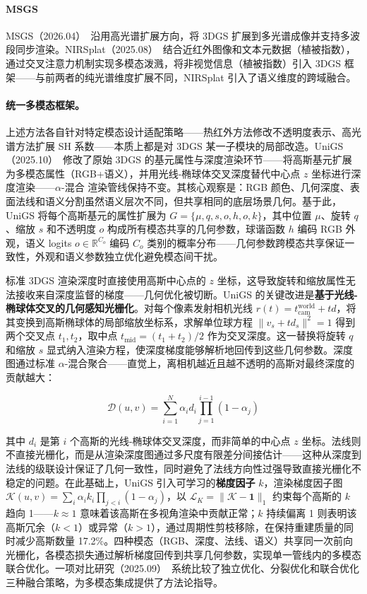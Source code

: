 \paragraph{MSGS}
MSGS（2026.04）~\cite{2604_13340}沿用高光谱扩展方向，将 3DGS 扩展到多光谱成像并支持多波段同步渲染。NIRSplat（2025.08）~\cite{2508_14443}结合近红外图像和文本元数据（植被指数），通过交叉注意力机制实现多模态泼溅，将非视觉信息（植被指数）引入 3DGS 框架——与前两者的纯光谱维度扩展不同，NIRSplat 引入了语义维度的跨域融合。

\paragraph{统一多模态框架。} 上述方法各自针对特定模态设计适配策略——热红外方法修改不透明度表示、高光谱方法扩展 SH 系数——本质上都是对 3DGS 某一子模块的局部改造。UniGS（2025.10）~\cite{2510_12174}修改了原始 3DGS 的基元属性与深度渲染环节——将高斯基元扩展为多模态属性（RGB+语义），并用光线-椭球体交叉深度替代中心点 $z$ 坐标进行深度渲染——$\alpha$-混合 渲染管线保持不变。其核心观察是：RGB 颜色、几何深度、表面法线和语义分割虽然语义层次不同，但共享相同的底层场景几何。基于此，UniGS 将每个高斯基元的属性扩展为 $G = \{\mu, q, s, o, h, o, k\}$，其中位置 $\mu$、旋转 $q$、缩放 $s$ 和不透明度 $o$ 构成所有模态共享的几何参数，球谐函数 $h$ 编码 RGB 外观，语义 logits $o \in \mathbb{R}^{C_o}$ 编码 $C_o$ 类别的概率分布——几何参数跨模态共享保证一致性，外观和语义参数独立优化避免模态间干扰。

标准 3DGS 渲染深度时直接使用高斯中心点的 $z$ 坐标，这导致旋转和缩放属性无法接收来自深度监督的梯度——几何优化被切断。UniGS 的关键改进是\textbf{基于光线-椭球体交叉的几何感知光栅化}。对每个像素发射相机光线 $r(t) = t_{\text{cam}}^{\text{world}} + td$，将其变换到高斯椭球体的局部缩放坐标系，求解单位球方程 $\|v_s + td_s\|^2 = 1$ 得到两个交叉点 $t_1, t_2$，取中点 $t_{\text{mid}} = (t_1+t_2)/2$ 作为交叉深度。这一替换将旋转 $q$ 和缩放 $s$ 显式纳入渲染方程，使深度梯度能够解析地回传到这些几何参数。深度图通过标准 $\alpha$-混合聚合——直觉上，离相机越近且越不透明的高斯对最终深度的贡献越大：

\begin{equation}
\mathcal{D}(u,v) = \sum_{i=1}^{N} \alpha_i d_i \prod_{j=1}^{i-1}(1-\alpha_j)
\end{equation}

其中 $d_i$ 是第 $i$ 个高斯的光线-椭球体交叉深度，而非简单的中心点 $z$ 坐标。法线则不直接光栅化，而是从渲染深度图通过多尺度有限差分间接估计——这种从深度到法线的级联设计保证了几何一致性，同时避免了法线方向性过强导致直接光栅化不稳定的问题。在此基础上，UniGS 引入可学习的\textbf{梯度因子} $k$，渲染梯度因子图 $\mathcal{K}(u,v) = \sum_i \alpha_i k_i \prod_{j<i}(1-\alpha_j)$，以 $\mathcal{L}_K = \|\mathcal{K} - \mathbf{1}\|_1$ 约束每个高斯的 $k$ 趋向 1——$k \approx 1$ 意味着该高斯在多视角渲染中贡献正常；$k$ 持续偏离 1 则表明该高斯冗余（$k < 1$）或异常（$k > 1$），通过周期性剪枝移除，在保持重建质量的同时减少高斯数量 17.2\%。四种模态（RGB、深度、法线、语义）共享同一次前向光栅化，各模态损失通过解析梯度回传到共享几何参数，实现单一管线内的多模态联合优化。一项对比研究（2025.09）~\cite{2509_00989}系统比较了独立优化、分裂优化和联合优化三种融合策略，为多模态集成提供了方法论指导。

